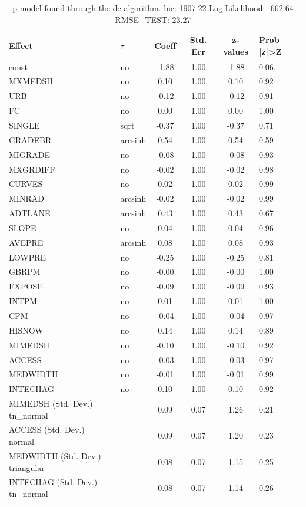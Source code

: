 \begin{table}
	\caption{p model found through the de algorithm. bic: 1907.22 Log-Likelihood: -662.64 RMSE_TEST: 23.27}
	\begin{center}
		\begin{tabular}{|l|l|c|c|c|l|}
			\hline
			Effect & $\tau$ & Coeff & Std. Err & z-values & Prob |z|>Z \\
			\hline
			const & no & -1.88 & 1.00 & -1.88 & 0.06. \\
			\hline
			MXMEDSH & no & 0.10 & 1.00 & 0.10 & 0.92 \\
			\hline
			URB & no & -0.12 & 1.00 & -0.12 & 0.91 \\
			\hline
			FC & no & 0.00 & 1.00 & 0.00 & 1.00 \\
			\hline
			SINGLE & sqrt & -0.37 & 1.00 & -0.37 & 0.71 \\
			\hline
			GRADEBR & arcsinh & 0.54 & 1.00 & 0.54 & 0.59 \\
			\hline
			MIGRADE & no & -0.08 & 1.00 & -0.08 & 0.93 \\
			\hline
			MXGRDIFF & no & -0.02 & 1.00 & -0.02 & 0.98 \\
			\hline
			CURVES & no & 0.02 & 1.00 & 0.02 & 0.99 \\
			\hline
			MINRAD & arcsinh & -0.02 & 1.00 & -0.02 & 0.99 \\
			\hline
			ADTLANE & arcsinh & 0.43 & 1.00 & 0.43 & 0.67 \\
			\hline
			SLOPE & no & 0.04 & 1.00 & 0.04 & 0.96 \\
			\hline
			AVEPRE & arcsinh & 0.08 & 1.00 & 0.08 & 0.93 \\
			\hline
			LOWPRE & no & -0.25 & 1.00 & -0.25 & 0.81 \\
			\hline
			GBRPM & no & -0.00 & 1.00 & -0.00 & 1.00 \\
			\hline
			EXPOSE & no & -0.09 & 1.00 & -0.09 & 0.93 \\
			\hline
			INTPM & no & 0.01 & 1.00 & 0.01 & 1.00 \\
			\hline
			CPM & no & -0.04 & 1.00 & -0.04 & 0.97 \\
			\hline
			HISNOW & no & 0.14 & 1.00 & 0.14 & 0.89 \\
			\hline
			MIMEDSH & no & -0.10 & 1.00 & -0.10 & 0.92 \\
			\hline
			ACCESS & no & -0.03 & 1.00 & -0.03 & 0.97 \\
			\hline
			MEDWIDTH & no & -0.01 & 1.00 & -0.01 & 0.99 \\
			\hline
			INTECHAG & no & 0.10 & 1.00 & 0.10 & 0.92 \\
			\hline
			MIMEDSH (Std. Dev.) tn_normal &  & 0.09 & 0.07 & 1.26 & 0.21 \\
			\hline
			ACCESS (Std. Dev.) normal &  & 0.09 & 0.07 & 1.20 & 0.23 \\
			\hline
			MEDWIDTH (Std. Dev.) triangular &  & 0.08 & 0.07 & 1.15 & 0.25 \\
			\hline
			INTECHAG (Std. Dev.) tn_normal &  & 0.08 & 0.07 & 1.14 & 0.26 \\
			\hline
		\end{tabular}
	\end{center}
\end{table}